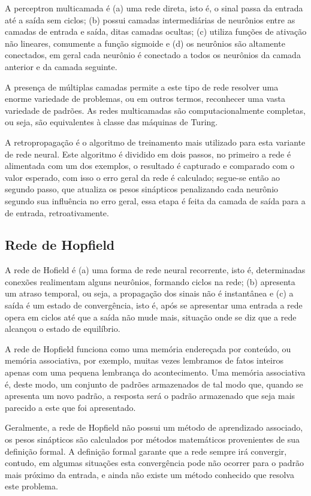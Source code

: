 A perceptron multicamada é (a) uma rede direta, isto é, o sinal passa da entrada
até a saída sem ciclos; (b) possui camadas intermediárias de neurônios entre as
camadas de entrada e saída, ditas camadas ocultas; (c) utiliza funções de
ativação não lineares, comumente a função sigmoide e (d) os neurônios são
altamente conectados, em geral cada neurônio é conectado a todos os neurônios
da camada anterior e da camada seguinte.

A presença de múltiplas camadas permite a este tipo de rede resolver uma enorme
variedade de problemas, ou em outros termos, reconhecer uma vasta variedade de
padrões. As redes multicamadas são computacionalmente completas, ou seja, são
equivalentes à classe das máquinas de Turing.

A retropropagação é o algoritmo de treinamento mais utilizado para esta variante
de rede neural. Este algoritmo é dividido em dois passos, no primeiro a rede é
alimentada com um dos exemplos, o resultado é capturado e comparado com o valor
esperado, com isso o erro geral da rede é calculado; segue-se então ao segundo
passo, que atualiza os pesos sinápticos penalizando cada neurônio segundo sua
influência no erro geral, essa etapa é feita da camada de saída para a de
entrada, retroativamente.

\subsection{Rede de Hopfield}

A rede de Hofield é (a) uma forma de rede neural recorrente, isto é,
determinadas conexões realimentam alguns neurônios, formando ciclos na rede; (b)
apresenta um atraso temporal, ou seja, a propagação dos sinais não é instantânea
e (c) a saída é um estado de convergência, isto é, após se apresentar uma entrada
a rede opera em ciclos até que a saída não mude mais, situação onde se diz que a
rede alcançou o estado de equilíbrio.

A rede de Hopfield funciona como uma memória endereçada por conteúdo, ou memória
associativa, por exemplo, muitas vezes lembramos de fatos inteiros apenas com uma
pequena lembrança do acontecimento. Uma memória associativa é, deste modo, um
conjunto de padrões armazenados de tal modo que, quando se apresenta um novo padrão,
a resposta será o padrão armazenado que seja mais parecido a este que foi apresentado.

Geralmente, a rede de Hopfield não possui um método de aprendizado associado,
os pesos sinápticos são calculados por métodos matemáticos provenientes de sua
definição formal. A definição formal garante que a rede sempre irá convergir,
contudo, em algumas situações esta convergência pode não ocorrer para o padrão
mais próximo da entrada, e ainda não existe um método conhecido que resolva
este problema.

